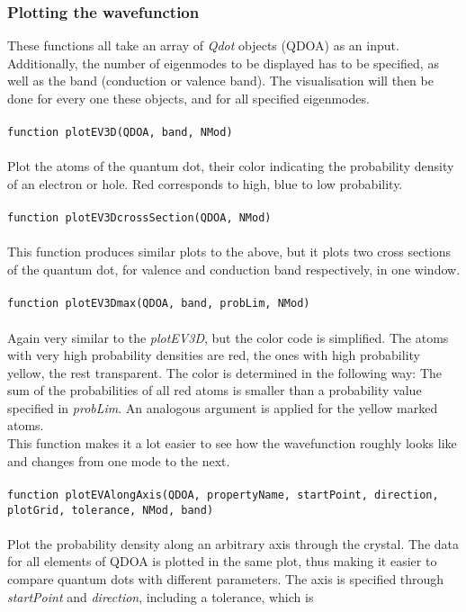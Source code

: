 	\subsubsection{Plotting the wavefunction}
		These functions all take an array of \textit{Qdot} objects (QDOA) as an input. Additionally, the number of eigenmodes to be displayed has to be specified, 
		as well as the band (conduction or valence band). The visualisation will then be done for every one these objects, and for all specified eigenmodes.\\\\
		\lstinline{function plotEV3D(QDOA, band, NMod) }\\\\
		Plot the atoms of the quantum dot, their color indicating the probability density of an electron or hole. Red corresponds to high, blue to low probability.\\\\
		\lstinline{function plotEV3DcrossSection(QDOA, NMod) }\\\\
		This function produces similar plots to the above, but it plots two cross sections of the quantum dot, for valence and conduction band respectively, 
		in one window.\\\\
		\lstinline{function plotEV3Dmax(QDOA, band, probLim, NMod)}\\\\
		Again very similar to the \textit{plotEV3D}, but the color code is simplified. The atoms with very high probability densities are red, the ones with high 
		probability yellow, the rest transparent. The color is determined in the following way: The sum of the probabilities of all red atoms is smaller than a 
		probability value specified in \textit{probLim}. An analogous argument is applied for the yellow marked atoms.\\
		This function makes it a lot easier to see how the wavefunction roughly looks like and changes from one mode to the next.\\\\
		\lstinline{function plotEVAlongAxis(QDOA, propertyName, startPoint, direction, plotGrid, tolerance, NMod, band)}\\\\
		Plot the probability density along an arbitrary axis through the crystal. The data for all elements of QDOA is plotted in the same plot, thus making it easier
		 to compare quantum dots with different parameters. The axis is specified through \textit{startPoint} and \textit{direction}, including a tolerance, which is 
